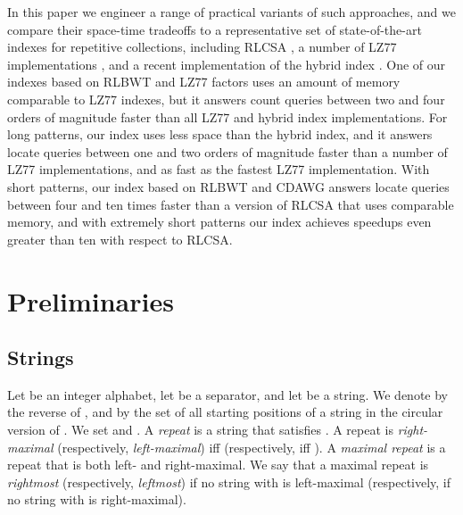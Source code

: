 \documentclass[a4paper,UKenglish]{lipics-v2016}
\begin{document}
In this paper we engineer a range of practical variants of such approaches, and we compare their space-time tradeoffs to a representative set of state-of-the-art indexes for repetitive collections, including RLCSA \cite{MakinenNSV10}, a number of LZ77 implementations \cite{kreft2010self}, and a recent implementation of the hybrid index \cite{valenzuela2016chico}. One of our indexes based on RLBWT and LZ77 factors uses an amount of memory comparable to LZ77 indexes, but it answers count queries between two and four orders of magnitude faster than all LZ77 and hybrid index implementations. For long patterns, our index uses less space than the hybrid index, and it answers locate queries between one and two orders of magnitude faster than a number of LZ77 implementations, and as fast as the fastest LZ77 implementation. With short patterns, our index based on RLBWT and CDAWG answers locate queries between four and ten times faster than a version of RLCSA that uses comparable memory, and with extremely short patterns our index achieves speedups even greater than ten with respect to RLCSA.









































\section{Preliminaries}

\subsection{Strings} \label{sec:strings}

Let  be an integer alphabet, let  be a separator, and let  be a string. We denote by  the reverse of , and by  the set of all starting positions of a string  in the circular version of . We set  and  . A \emph{repeat}  is a string that satisfies . A repeat  is \emph{right-maximal} (respectively, \emph{left-maximal}) iff  (respectively, iff ). A \emph{maximal repeat} is a repeat that is both left- and right-maximal. We say that a maximal repeat  is \emph{rightmost} (respectively, \emph{leftmost}) if no string  with  is left-maximal (respectively, if no string  with  is right-maximal).
\end{document}
